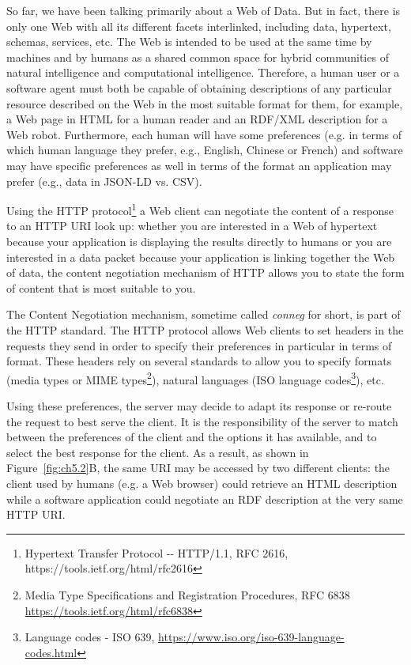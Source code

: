 So far, we have been talking primarily about a Web of Data.  But in fact, there  is only one
Web with all its different facets interlinked, including data, hypertext, schemas,
services, etc.  The Web is intended to be used at the same time by
machines and by humans as a shared common space for hybrid communities
of natural intelligence and computational intelligence. Therefore, a
human user or a software agent must both be capable of obtaining
descriptions of any particular resource described on the Web  in the most suitable
format for them, for example,  a Web page in HTML for a human reader  and an RDF/XML
description for a Web robot.   Furthermore, each human will have some preferences (e.g.
in terms of which human language they prefer, e.g.,  English, Chinese or French) and
software may have specific preferences as well  in terms of the format an application may prefer (e.g., 
data in JSON-LD vs. CSV).

Using the HTTP protocol\footnote{Hypertext Transfer Protocol -\/-
HTTP/1.1, RFC 2616, https://tools.ietf.org/html/rfc2616} a Web client
can negotiate the content of a response to an HTTP URI look up: whether
you are interested in a Web of hypertext because your application is
displaying the results directly to humans or you are interested in a data packet 
because your application is linking together the Web of data, 
the content negotiation mechanism of HTTP
allows you to state the form of content that is most suitable to you.

The Content Negotiation mechanism, sometime called \emph{conneg} for short, is part of the
HTTP standard. The HTTP protocol allows Web clients to set headers in
the requests they send in order to specify their preferences in
particular in terms of format. These headers rely on several standards
to allow you to specify formats (media types or MIME types\footnote{Media
  Type Specifications and Registration Procedures, RFC 6838
  \url{https://tools.ietf.org/html/rfc6838}}), natural languages (ISO
language codes\footnote{Language codes - ISO 639,
  \url{https://www.iso.org/iso-639-language-codes.html}}), etc.

Using these preferences, the server may decide to adapt its response or
re-route the request to best serve the client. It is the responsibility
of the server to match between the preferences of the client and the
options it has available, and to select the best response for the
client. As a result, as shown in Figure~\ref{fig:ch5.2}B,  the same URI may be accessed
by two different clients: the client used by humans (e.g. a Web browser)
could retrieve an HTML description while a software  application could
negotiate an RDF description at the very same HTTP URI.

